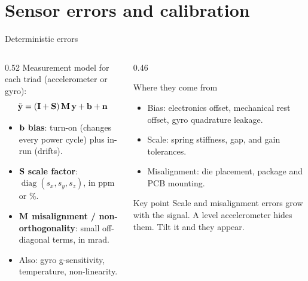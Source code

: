 \section{Sensor errors and calibration}

\begin{frame}{Deterministic errors}
  \begin{columns}[T]
    \begin{column}{0.52\textwidth}
      \small
      Measurement model for each triad (accelerometer or gyro):
      \[
        \tilde{\mathbf{y}} = (\mathbf{I}+\mathbf{S})\,\mathbf{M}\,\mathbf{y} + \mathbf{b} + \mathbf{n}
      \]
      \vspace{-1em}
      \begin{itemize}
        \item $\mathbf{b}$ \textbf{bias}: turn-on (changes every power cycle) plus in-run (drifts).
        \item $\mathbf{S}$ \textbf{scale factor}: $\operatorname{diag}(s_x,s_y,s_z)$, in ppm or \%.
        \item $\mathbf{M}$ \textbf{misalignment / non-orthogonality}: small off-diagonal terms, in mrad.
        \item Also: gyro g-sensitivity, temperature, non-linearity.
      \end{itemize}
    \end{column}
    \begin{column}{0.46\textwidth}
      \footnotesize
      \begin{block}{Where they come from}
        \begin{itemize}
          \item Bias: electronics offset, mechanical rest offset, gyro quadrature leakage.
          \item Scale: spring stiffness, gap, and gain tolerances.
          \item Misalignment: die placement, package and PCB mounting.
        \end{itemize}
      \end{block}
      \vspace{0.4em}
      \begin{alertblock}{Key point}
        Scale and misalignment errors grow with the signal. A level accelerometer hides them. Tilt it and they appear.
      \end{alertblock}
    \end{column}
  \end{columns}
\end{frame}

